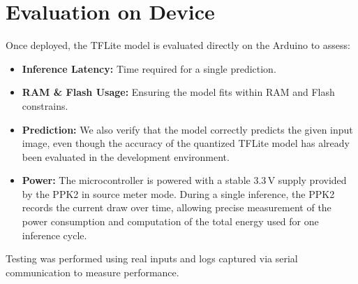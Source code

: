 \section{Evaluation on Device}

Once deployed, the TFLite model is evaluated directly on the Arduino to assess:

\begin{itemize}

\item \textbf{Inference Latency:} Time required for a single prediction.

\item \textbf{RAM \& Flash Usage:} Ensuring the model fits within RAM and Flash constrains.

\item \textbf{Prediction:} We also verify that the model correctly predicts the given input image, even though the accuracy of the quantized TFLite model has already been evaluated in the development environment.

\item \textbf{Power:} The microcontroller is powered with a stable 3.3\,V supply provided by the PPK2 in source meter mode. During a single inference, the PPK2 records the current draw over time, allowing precise measurement of the power consumption and computation of the total energy used for one inference cycle.



\end{itemize}

Testing was performed using real inputs and logs captured via serial communication to measure performance.

